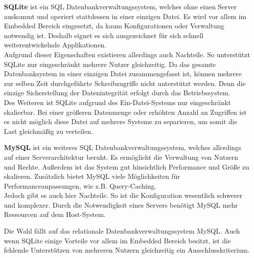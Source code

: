\textbf{SQLite} ist ein \ac{SQL} Datenbankverwaltungssystem, welches ohne einen Server auskommt und operiert stattdessen in einer einzigen Datei. Es wird vor allem im Embedded Bereich eingesetzt, da kaum Konfigurationen oder Verwaltung notwendig ist. Deshalb eignet es sich ausgezeichnet für sich schnell weiterentwickelnde Applikationen.
\\
Aufgrund dieser Eigenschaften existieren allerdings auch Nachteile. So unterstützt SQLite nur eingeschränkt mehrere Nutzer gleichzeitig. Da das gesamte Datenbanksystem in einer einzigen Datei zusammengefasst ist, können mehrere zur selben Zeit durchgeführte Schreibzugriffe nicht unterstützt werden. Denn die einzige Sicherstellung der Datenintegrität erfolgt durch das Betriebssystem. 
\\
Des Weiteren ist SQLite aufgrund des Ein-Datei-Systems nur eingeschränkt skalierbar. Bei einer größeren Datenmenge oder erhöhten Anzahl an Zugriffen ist es nicht möglich diese Datei auf mehrere Systeme zu separieren, um somit die Last gleichmäßig zu verteilen.

\textbf{MySQL} ist ein weiteres \ac{SQL} Datenbankverwaltungssystem, welches allerdings auf einer Serverarchitektur beruht. 
Es ermöglicht die Verwaltung von Nutzern und Rechte. Außerdem ist das System gut hinsichtlich Performance und Größe zu skalieren. Zusätzlich bietet MySQL viele Möglichkeiten für Performanceanpassungen, wie z.B. Query-Caching.
\\
Jedoch gibt es auch hier Nachteile. So ist die Konfiguration wesentlich schwerer und komplexer. Durch die Notwendigkeit eines Servers benötigt MySQL mehr Ressourcen auf dem Host-System.

Die Wahl fällt auf das relationale Datenbankverwaltungssystem MySQL. Auch wenn SQLite einige Vorteile vor allem im Embedded Bereich besitzt, ist die fehlende Unterstützen von mehreren Nutzern gleichzeitig ein Ausschlusskriterium.

\cite{saake2010datenbanken}